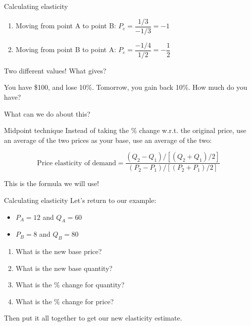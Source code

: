 \documentclass[aspectratio=169]{beamer}
\begin{document}
\begin{frame}{Calculating elasticity}
    
    \begin{enumerate}
    \item Moving from point A to point B: $P_e = \dfrac{1/3}{-1/3} = -1$
    \item Moving from point B to point A: $P_e = \dfrac{-1/4}{1/2} = -\dfrac{1}{2}$
    \end{enumerate}

    Two different values! What gives?

    \medskip

    You have \$100, and lose 10\%. Tomorrow, you gain back 10\%. How much do you have?

    \medskip

    What can we do about this?

\end{frame}

\begin{frame}{Midpoint technique}
Instead of taking the \% change w.r.t. the original price, use an average of the two prices as your base,  use an average of the two:

$$
\text{Price elasticity of demand} = \dfrac{(Q_2 - Q_1)/[(Q_2 + Q_1)/2]}{(P_2 - P_1)/[(P_2 + P_1)/2]}
$$

This is the formula we will use!

\end{frame}

\begin{frame}{Calculating elasticity}
    Let's return to our example:
    \begin{itemize}
        \item $P_A=12$ and $Q_A=60$
        \item $P_B=8$ and $Q_B=80$
    \end{itemize}
    
    \medskip

    \begin{enumerate}
        \item What is the new base price?
        \item What is the new base quantity?
        \item What is the \% change for quantity?
        \item What is the \% change for price?
    \end{enumerate}

    Then put it all together to get our new elasticity estimate.
\end{frame}
\end{document}
